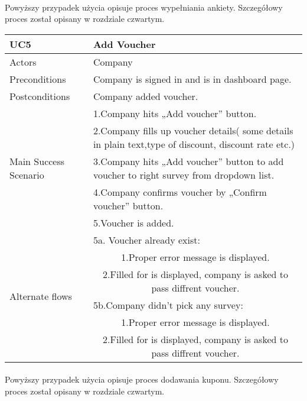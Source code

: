 \paragraph{}
Powyższy przypadek użycia opisuje proces wypełniania ankiety. Szczegółowy proces został opisany w rozdziale czwartym.
	
	
	\begin{table}[H]
	\centering
	\sffamily\captionsetup{justification=raggedright,singlelinecheck=false,position = below, font = sf}
	\begin{tabular}{|m{3.5cm}|m{11cm}|}
	\hline 
	UC5 & Add Voucher \\
	\hline
	Actors & Company \\
	\hline
	Preconditions & Company is signed in and is in dashboard page. \\
	\hline
	Postconditions & Company added voucher. \\	
	\hline
	\multirow{5}{*}{Main Success Scenario} & 1.Company hits „Add voucher” button. \\
	\cline{2-2}
	& 2.Company fills up voucher details( some details in plain text,type of discount, discount rate etc.) \\
	\cline{2-2}
	& 3.Company hits „Add voucher” button to add voucher to right survey from dropdown list. \\
	\cline{2-2}
	& 4.Company confirms voucher by „Confirm voucher” button. \\
	\cline{2-2}
	& 5.Voucher is added. \\
	\hline
	\multirow{6}{*}{Alternate flows} & 5a. Voucher already exist: \\
	\cline{2-2}
	& \multicolumn{1}{c|}{1.Proper error message is displayed.} \\
	\cline{2-2}
	& \multicolumn{1}{c|}{2.Filled for is displayed, company is asked to pass diffrent voucher.} \\
	\cline{2-2}
	& 5b.Company didn't pick any survey: \\
	\cline{2-2}
	& \multicolumn{1}{c|}{1.Proper error message is displayed.} \\
	\cline{2-2}
	& \multicolumn{1}{c|}{2.Filled for is displayed, company is asked to pass diffrent voucher.} \\
	\cline{2-2}
	\hline
	\end{tabular}
	\end{table}
	
\paragraph{}
Powyższy przypadek użycia opisuje proces dodawania kuponu. Szczegółowy proces został opisany w rozdziale czwartym.
	
